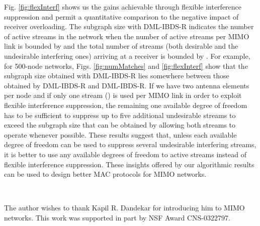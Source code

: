 \documentclass[journal,12pt,onecolumn]{IEEEtran}
\begin{document}
Fig.\,\,\ref{fig:flexInterf} shows us the gains achievable through
flexible interference suppression and permit a quantitative comparison to the
negative impact of receiver overloading. The subgraph size with
DML-IBDS-R indicates the number of active streams in the
network when the number of active streams per MIMO link is bounded by
 and the total number of streams (both desirable and the undesirable
interfering ones) arriving at a receiver is bounded by . For example, for 500-node networks,
Figs.\,\,\ref{fig:numMatches} and \ref{fig:flexInterf} show that the
subgraph size obtained with DML-IBDS-R 
lies somewhere between those obtained by DML-IBDS-R and
DML-IBDS-R. If we have two antenna elements per node and if only
one stream () is used per MIMO link in order to exploit flexible
interference suppression, the remaining one available degree of freedom has to be 
sufficient to suppress up to five additional undesirable streams to exceed
the subgraph size that can be obtained by allowing both streams to
operate whenever possible. These results suggest that, unless each
available degree of freedom can be used to suppress several undesirable
interfering streams, it is better to use any available degrees of
freedom to active streams instead of flexible interference suppression.
These insights offered by our algorithmic results can be used to design
better MAC protocols for MIMO networks.

~\\

The author wishes to thank Kapil R. Dandekar for introducing him to MIMO networks.
This work was supported in part by NSF Award CNS-0322797.




\end{document}
